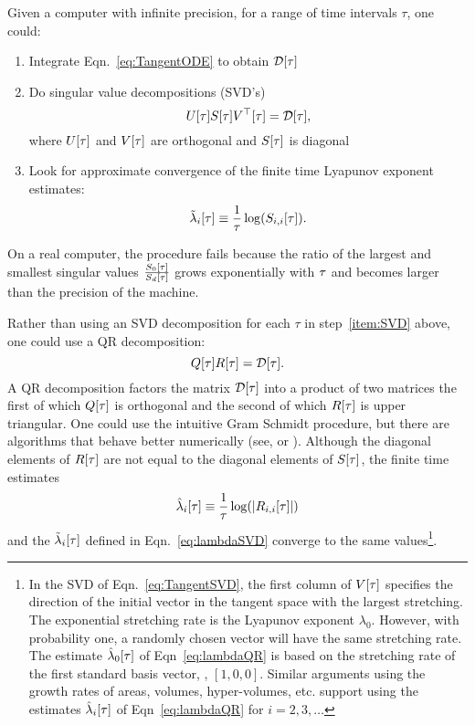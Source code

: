 Given a computer with infinite precision, for a range of time
intervals $\tau$, one could:
\begin{enumerate}
\item Integrate Eqn.~\eqref{eq:TangentODE} to obtain $\ti{\DM}{\ct}$
\item \label{item:SVD} Do singular value decompositions (SVD's)
  \begin{equation}
    \label{eq:TangentSVD}
    \ti{U}{\ct} \ti{S}{\ct} \ti{V\transpose}{\ct} = \ti{\DM}{\ct},
  \end{equation}
  where ${U}{[\tau]}$ and ${V}{[\tau]}$ are orthogonal and ${S}{[\tau]}$ is
  diagonal
\item Look for approximate convergence of the finite time Lyapunov
  exponent estimates:
  \begin{equation}
    \label{eq:lambdaSVD}
    {\tilde \lambda_i}{[\tau]} \equiv \frac{1}{\tau} \log( {S_{i,i}}{[\tau]} ) .
  \end{equation}
\end{enumerate}
On a real computer, the procedure fails because the ratio of the
largest and smallest singular values
$\frac{{S_0}{[\tau]}}{{S_d}{[\tau]}}$ grows exponentially with $\tau$
and becomes larger than the precision of the machine.

Rather than using an SVD decomposition for each $\tau$ in
step~\ref{item:SVD} above, one could use a QR decomposition:
\begin{equation}
  \label{eq:TangentQR}
  \ti{Q}{\ct} \ti{R}{\ct} = \ti{\DM}{\ct}.
\end{equation}
A QR decomposition factors the matrix $\ti{\DM}{\ct}$ into a product
of two matrices the first of which ${Q}{[\tau]}$ is orthogonal and the
second of which ${R}{[\tau]}$ is upper triangular.  One could use the
intuitive Gram Schmidt procedure, but there are algorithms that behave
better numerically (see, \eg \cite{GandL3} or \cite{Press92}).
Although the diagonal elements of ${R}{[\tau]}$ are not equal to the
diagonal elements of ${S}{[\tau]}$, the finite time estimates
\begin{equation}
  \label{eq:lambdaQR}
  {\hat \lambda_i}{[\tau]} \equiv \frac{1}{\tau} \log( \left|
  {R_{i,i}}{[\tau]} \right| )
\end{equation}
and the ${\tilde \lambda_i}{[\tau]}$ defined in
Eqn.~\eqref{eq:lambdaSVD} converge to the same values\footnote{In the
  SVD of Eqn.~\eqref{eq:TangentSVD}, the first column of ${V}{[\tau]}$
  specifies the direction of the initial vector in the tangent space
  with the largest stretching.  The exponential stretching rate is the
  Lyapunov exponent $\lambda_0$.  However, with probability one, a
  randomly chosen vector will have the same stretching rate.  The
  estimate ${\hat \lambda_0}{[\tau]}$ of Eqn~\eqref{eq:lambdaQR} is
  based on the stretching rate of the first standard basis vector, \ie,
  $[1,0,0]$.
  Similar arguments using the growth rates of areas, volumes,
  hyper-volumes, etc. support using the estimates ${\hat
    \lambda_i}{[\tau]}$ of Eqn~\eqref{eq:lambdaQR} for $i=2,3,\ldots$}.

